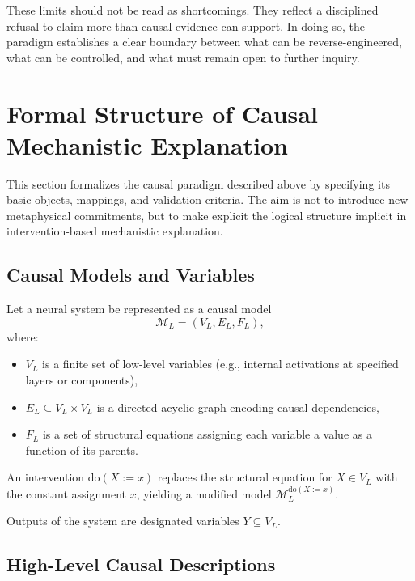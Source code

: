 \documentclass[11pt]{article}
\begin{document}
These limits should not be read as shortcomings. They reflect a disciplined refusal to claim more than causal evidence can support. In doing so, the paradigm establishes a clear boundary between what can be reverse-engineered, what can be controlled, and what must remain open to further inquiry.

\section{Formal Structure of Causal Mechanistic Explanation}

This section formalizes the causal paradigm described above by specifying its basic objects, mappings, and validation criteria. The aim is not to introduce new metaphysical commitments, but to make explicit the logical structure implicit in intervention-based mechanistic explanation.

\subsection{Causal Models and Variables}

Let a neural system be represented as a causal model
\[
\mathcal{M}_L = (V_L, E_L, F_L),
\]
where:
\begin{itemize}
\item $V_L$ is a finite set of low-level variables (e.g., internal activations at specified layers or components),
\item $E_L \subseteq V_L \times V_L$ is a directed acyclic graph encoding causal dependencies,
\item $F_L$ is a set of structural equations assigning each variable a value as a function of its parents.
\end{itemize}

An intervention $\mathrm{do}(X := x)$ replaces the structural equation for $X \in V_L$ with the constant assignment $x$, yielding a modified model $\mathcal{M}_L^{\mathrm{do}(X:=x)}$.

Outputs of the system are designated variables $Y \subseteq V_L$.

\subsection{High-Level Causal Descriptions}
\end{document}
